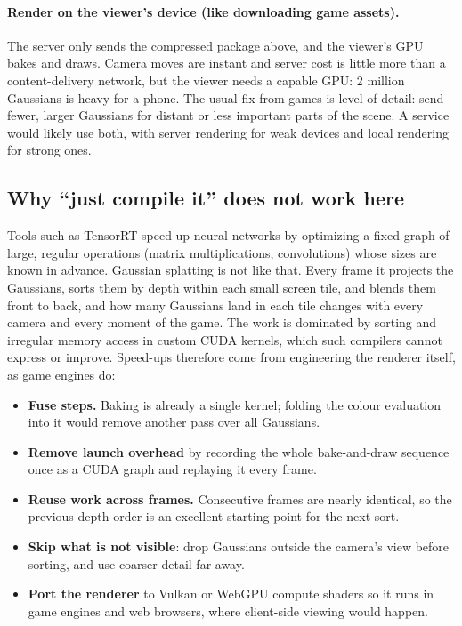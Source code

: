 \documentclass[11pt]{article}
\begin{document}
\paragraph{Render on the viewer's device (like downloading game assets).} The server only sends
the compressed package above, and the viewer's GPU bakes and draws. Camera moves are instant and
server cost is little more than a content-delivery network, but the viewer needs a capable GPU:
2 million Gaussians is heavy for a phone. The usual fix from games is level of detail: send fewer,
larger Gaussians for distant or less important parts of the scene. A service would likely use both,
with server rendering for weak devices and local rendering for strong ones.

\subsection{Why ``just compile it'' does not work here}
Tools such as TensorRT speed up neural networks by optimizing a fixed graph of large, regular
operations (matrix multiplications, convolutions) whose sizes are known in advance. Gaussian
splatting is not like that. Every frame it projects the Gaussians, sorts them by depth within each
small screen tile, and blends them front to back, and how many Gaussians land in each tile changes
with every camera and every moment of the game. The work is dominated by sorting and irregular
memory access in custom CUDA kernels, which such compilers cannot express or improve. Speed-ups
therefore come from engineering the renderer itself, as game engines do:
\begin{itemize}
\item \textbf{Fuse steps.} Baking is already a single kernel; folding the colour evaluation into it
would remove another pass over all Gaussians.
\item \textbf{Remove launch overhead} by recording the whole bake-and-draw sequence once as a CUDA
graph and replaying it every frame.
\item \textbf{Reuse work across frames.} Consecutive frames are nearly identical, so the previous
depth order is an excellent starting point for the next sort.
\item \textbf{Skip what is not visible}: drop Gaussians outside the camera's view before sorting,
and use coarser detail far away.
\item \textbf{Port the renderer} to Vulkan or WebGPU compute shaders so it runs in game engines and
web browsers, where client-side viewing would happen.
\end{itemize}
\end{document}
